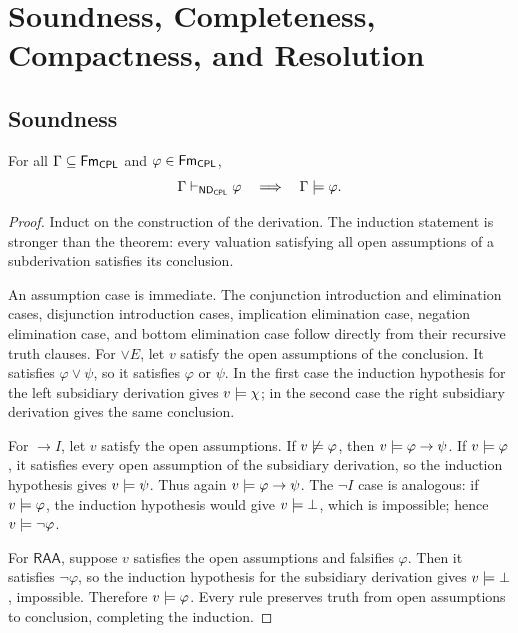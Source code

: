\chapter{Soundness, Completeness, Compactness, and Resolution}
\label{ch:prop-metatheory}

\section{Soundness}
\label{sec:prop-metatheory-01}

\begin{theorem}
\label{thm:prop-nd-soundness}
For all \(\Gamma\subseteq\mathsf{Fm}_{\mathsf{CPL}}\) and
\(\varphi\in\mathsf{Fm}_{\mathsf{CPL}}\),
\[
 \Gamma\vdash_{\mathsf{ND}_{\mathsf{CPL}}}\varphi
 \quad\Longrightarrow\quad
 \Gamma\models\varphi.
\]
\end{theorem}
\begin{proof}
Induct on the construction of the derivation.  The induction statement is
stronger than the theorem: every valuation satisfying all open assumptions of
a subderivation satisfies its conclusion.

An assumption case is immediate.  The conjunction introduction and
elimination cases, disjunction introduction cases, implication elimination
case, negation elimination case, and bottom elimination case follow directly
from their recursive truth clauses.  For \(\lor E\), let \(v\) satisfy the
open assumptions of the conclusion.  It satisfies \(\varphi\lor\psi\), so it
satisfies \(\varphi\) or \(\psi\).  In the first case the induction hypothesis
for the left subsidiary derivation gives \(v\models\chi\); in the second case
the right subsidiary derivation gives the same conclusion.

For \(\to I\), let \(v\) satisfy the open assumptions.  If
\(v\not\models\varphi\), then \(v\models\varphi\to\psi\).  If
\(v\models\varphi\), it satisfies every open assumption of the subsidiary
derivation, so the induction hypothesis gives \(v\models\psi\).  Thus again
\(v\models\varphi\to\psi\).  The \(\neg I\) case is analogous: if
\(v\models\varphi\), the induction hypothesis would give
\(v\models\bot\), which is impossible; hence
\(v\models\neg\varphi\).

For \(\mathsf{RAA}\), suppose \(v\) satisfies the open assumptions
and falsifies \(\varphi\).  Then it satisfies \(\neg\varphi\), so the
induction hypothesis for the subsidiary derivation gives
\(v\models\bot\), impossible.  Therefore \(v\models\varphi\).  Every
rule preserves truth from open assumptions to conclusion, completing the
induction.
\end{proof}

